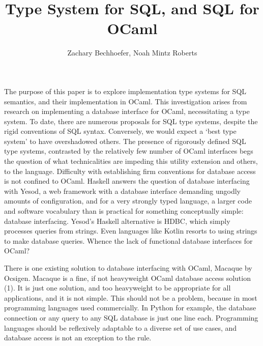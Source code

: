 \documentclass[12pt]{article}
\title{Type System for SQL, and SQL for OCaml}
\author{Zachary Bechhoefer, Noah Mintz Roberts}
\begin{document}
\maketitle

	The purpose of this paper is to explore implementation type systems for SQL semantics, and their implementation in OCaml. This investigation arises from research on implementing a database interface for OCaml, necessitating a type system. To date, there are numerous  proposals for SQL type systems, despite the rigid conventions of SQL syntax. Conversely, we would expect a ‘best type system’ to have overshadowed others. The presence of rigorously defined SQL type systems, contrasted by the relatively few number of OCaml interfaces begs the question of what technicalities are impeding this utility extension and others, to the language. Difficulty with establishing firm conventions for database access is not confined to OCaml. Haskell answers the question of database interfacing with Yesod, a web framework with a database interface demanding ungodly amounts of configuration, and for a very strongly typed language, a larger code and software vocabulary than is practical for something conceptually simple: database interfacing. Yesod’s Haskell alternative is HDBC, which simply processes queries from strings. Even languages like Kotlin resorts to using strings to make database queries. Whence the lack of functional database interfaces for OCaml?

	There is one existing solution to database interfacing with OCaml, Macaque by Ocsigen. Macaque is a fine, if not heavyweight OCaml database access solution (1). It is just one solution, and too heavyweight to be appropriate for all applications, and it is not simple. This should not be a problem, because in most programming languages used commercially. In Python for example, the database connection or any query to any SQL database is just one line each. Programming languages should be reflexively adaptable to a diverse set of use cases, and database access is not an exception to the rule.
\end{document}
